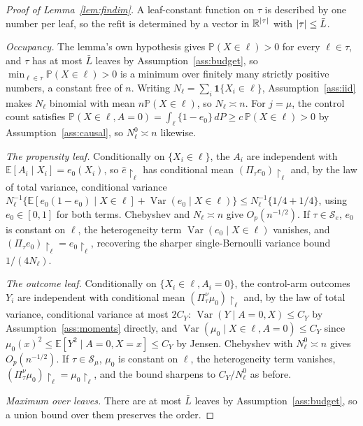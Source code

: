 \documentclass[11pt]{article}
\theoremstyle{plain}
\theoremstyle{definition}
\theoremstyle{remark}
\newcommand{\E}{\mathbb{E}}
\newcommand{\PP}{\mathbb{P}}
\newcommand{\R}{\mathbb{R}}
\newcommand{\cS}{\mathcal{S}}
\newcommand{\ez}{e_0}
\newcommand{\mz}{\mu_0}
\newcommand{\ehat}{\widehat{e}}
\DeclareMathOperator{\Var}{Var}
\DeclarePairedDelimiter{\card}{\lvert}{\rvert}
\begin{document}
\begin{proof}[Proof of Lemma~\ref{lem:findim}]
A leaf-constant function on $\tau$ is described by one number per leaf, so the
refit is determined by a vector in $\R^{\card\tau}$ with
$\card\tau\le\bar L$.

\emph{Occupancy.} The lemma's own hypothesis gives $\PP(X\in\ell)>0$ for
every $\ell\in\tau$, and $\tau$ has at most $\bar L$ leaves by
Assumption~\ref{ass:budget}, so $\min_{\ell\in\tau}\PP(X\in\ell)>0$ is a
minimum over finitely many strictly positive numbers, a constant free of
$n$. Writing
$N_\ell=\sum_i\mathbf1\{X_i\in\ell\}$, Assumption~\ref{ass:iid} makes $N_\ell$
binomial with mean $n\PP(X\in\ell)$, so $N_\ell\asymp n$. For $j=\mu$, the
control count satisfies
$\PP(X\in\ell,A=0)=\int_\ell\{1-\ez\}\,dP\ge c\,\PP(X\in\ell)>0$ by
Assumption~\ref{ass:causal}, so $N^0_\ell\asymp n$ likewise.

\emph{The propensity leaf.} Conditionally on $\{X_i\in\ell\}$, the $A_i$ are
independent with $\E[A_i\mid X_i]=\ez(X_i)$, so $\ehat\restriction_\ell$ has
conditional mean $(\Pi_\tau\ez)\restriction_\ell$ and, by the law of total
variance, conditional variance
$N_\ell^{-1}\{\E[\ez(1-\ez)\mid X\in\ell]+\Var(\ez\mid X\in\ell)\}
\le N_\ell^{-1}\{1/4+1/4\}$, using $\ez\in[0,1]$ for both terms. Chebyshev
and $N_\ell\asymp n$ give $O_p(n^{-1/2})$. If $\tau\in\cS_e$, $\ez$ is
constant on $\ell$, the heterogeneity term $\Var(\ez\mid X\in\ell)$ vanishes,
and $(\Pi_\tau\ez)\restriction_\ell=\ez\restriction_\ell$, recovering the
sharper single-Bernoulli variance bound $1/(4N_\ell)$.

\emph{The outcome leaf.} Conditionally on $\{X_i\in\ell,A_i=0\}$, the
control-arm outcomes $Y_i$ are independent with conditional mean
$(\Pi^\nu_\tau\mz)\restriction_\ell$ and, by the law of total variance,
conditional variance at most $2C_Y$: $\Var(Y\mid A=0,X)\le C_Y$ by
Assumption~\ref{ass:moments} directly, and $\Var(\mz\mid X\in\ell,A=0)\le C_Y$
since $\mz(x)^2\le\E[Y^2\mid A=0,X=x]\le C_Y$ by Jensen. Chebyshev with
$N^0_\ell\asymp n$ gives $O_p(n^{-1/2})$. If $\tau\in\cS_\mu$, $\mz$ is
constant on $\ell$, the heterogeneity term vanishes,
$(\Pi^\nu_\tau\mz)\restriction_\ell=\mz\restriction_\ell$, and the bound
sharpens to $C_Y/N^0_\ell$ as before.

\emph{Maximum over leaves.} There are at most $\bar L$ leaves by
Assumption~\ref{ass:budget}, so a union bound over them preserves the order.
\end{proof}
\end{document}
